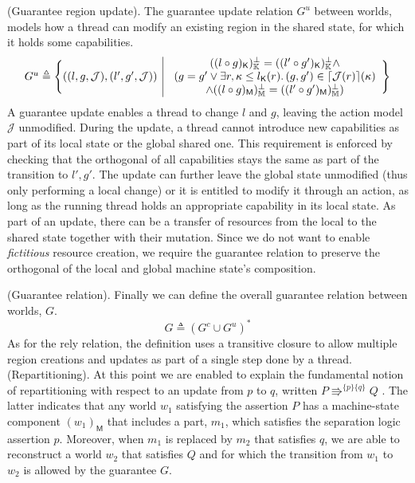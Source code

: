  (Guarantee region update). The guarantee update relation $G^u$ between worlds, models how a thread can modify an existing region in the shared state, for which it holds some capabilities.
\[
\begin{array}{r | l}
	G^u \triangleq \Bigg\{ ((l, g, \mathcal{J}), (l', g', \mathcal{J}))
	&
	\begin{array}{c}
		((l \circ g)_\mathsf{K})_\mathbb{K}^\bot = ((l' \circ g')_\mathsf{K})_\mathbb{K}^\bot \land \\
		(g = g' \lor \exists r, \kappa \leq l_\mathsf{K}(r) \ldotp (g, g') \in \lceil \mathcal{J}(r) \rceil(\kappa)  \\ \land ((l \circ g)_\mathsf{M})_\mathbb{M}^\bot = ((l' \circ g')_\mathsf{M})_\mathbb{M}^\bot )
	\end{array}
	\Bigg\}
\end{array}
\]
A guarantee update enables a thread to change $l$ and $g$, leaving the action model $\mathcal{J}$ unmodified. During the update, a thread cannot introduce new capabilities as part of its local state or the global shared one. This requirement is enforced by checking that the orthogonal of all capabilities stays the same as part of the transition to $l', g'$. The update can further leave the global state unmodified (thus only performing a local change) or it is entitled to modify it through an action, as long as the running thread holds an appropriate capability in its local state. As part of an update, there can be a transfer of resources from the local to the shared state together with their mutation. Since we do not want to enable \textit{fictitious} resource creation, we require the guarantee relation to preserve the orthogonal of the local and global machine state's composition.

 (Guarantee relation). Finally we can define the overall guarantee relation between worlds, $G$.
\[
	G \triangleq (G^c \cup G^u)^*
\]
As for the rely relation, the definition uses a transitive closure to allow multiple region creations and updates as part of a single step done by a thread. \\

 (Repartitioning). At this point we are enabled to explain the fundamental notion of repartitioning with respect to an update from $p$ to $q$, written $P \Rrightarrow^{\{p\}\{q\}} Q$ \cite{cap}. The latter indicates that any world $w_1$ satisfying the assertion $P$ has a machine-state component $(w_1)_\mathsf{M}$ that includes a part, $m_1$, which satisfies the separation logic assertion $p$. Moreover, when $m_1$ is replaced by $m_2$ that satisfies $q$, we are able to reconstruct a world $w_2$ that satisfies $Q$ and for which the transition from $w_1$ to $w_2$ is allowed by the guarantee $G$.

